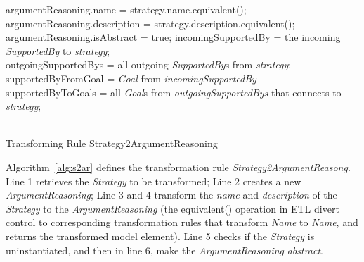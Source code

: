 \begin{algorithm}[ht!]
{		argumentReasoning.name = strategy.name.equivalent();\\
		argumentReasoning.description = strategy.description.equivalent();\\
		 {
			argumentReasoning.isAbstract = true;
		}
		\Let incomingSupportedBy = the incoming \textit{SupportedBy} to \textit{strategy};\\
		\Let outgoingSupportedBys = all outgoing \textit{SupportedBy}s from \textit{strategy};\\
		\Let supportedByFromGoal = \textit{Goal} from \textit{incomingSupportedBy}\\
		\Let supportedByToGoals = all \textit{Goal}s from \textit{outgoingSupportedBys} that connects to \textit{strategy};\\
	}
	\
	\caption{Transforming Rule Strategy2ArgumentReasoning}
	\label{alg:s2ar}
\end{algorithm}
Algorithm~\ref{alg:s2ar} defines the transformation rule \textit{Strategy2ArgumentReasong}. 
Line 1 retrieves the \textit{Strategy} to be transformed;
Line 2 creates a new \textit{ArgumentReasoning};
Line 3 and 4 transform the \textit{name} and \textit{description} of the \textit{Strategy} to the \textit{ArgumentReasoning} (the equivalent() operation in ETL divert control to corresponding transformation rules that transform \textit{Name} to \textit{Name}, and returns the transformed model element).
Line 5 checks if the \textit{Strategy} is uninstantiated, and then in line 6, make the \textit{ArgumentReasoning} \textit{abstract}.
